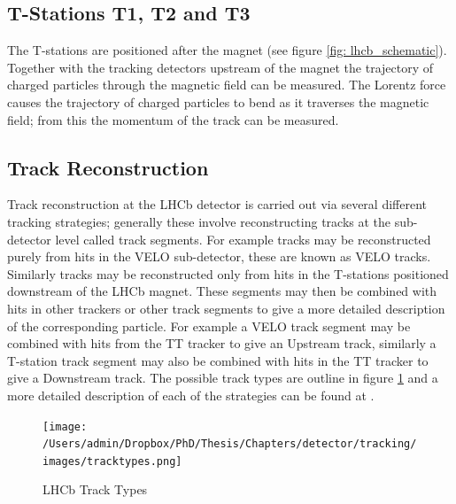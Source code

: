 \subsection{T-Stations T1, T2 and T3}

The T-stations are positioned after the magnet (see figure \ref{fig: lhcb_schematic}). Together with the tracking detectors upstream of the magnet the trajectory of charged particles through the magnetic field can be measured. The Lorentz force causes the trajectory of charged particles to bend as it traverses the magnetic field; from this the momentum of the track can be measured.

\subsection{Track Reconstruction}
\label{subsection: tracking, track reconstruction}

Track reconstruction at the LHCb detector is carried out via several different tracking strategies; generally these involve reconstructing tracks at the sub-detector level called track segments. For example tracks may be reconstructed purely from hits in the VELO sub-detector, these are known as VELO tracks. Similarly tracks may be reconstructed only from hits in the T-stations positioned downstream of the LHCb magnet. These segments may then be combined with hits in other trackers or other track segments to give a more detailed description of the corresponding particle. For example a VELO track segment may be combined with hits from the TT tracker to give an Upstream track, similarly a T-station track segment may also be combined with hits in the TT tracker to give a Downstream track. The possible track types are outline in figure \ref{fig: track types} and a more detailed description of each of the strategies can be found at \cite{lhcb_track_strategies}.

\begin{figure}[h]
	\centering
	\texttt{[image: /Users/admin/Dropbox/PhD/Thesis/Chapters/detector/tracking/images/tracktypes.png]}
	\caption{LHCb Track Types}
	\label{fig: track types}
\end{figure}
